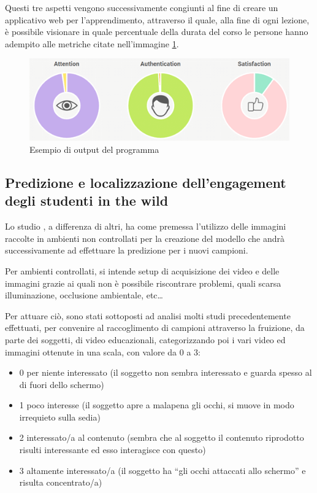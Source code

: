 Questi tre aspetti vengono successivamente congiunti al fine di creare un applicativo web per l’apprendimento, attraverso il quale, alla fine di ogni lezione, è possibile visionare in quale percentuale della durata del corso le persone hanno adempito alle metriche citate nell'immagine \ref{fig:image32}.

\begin{figure}
    \begin{center}    
        \includegraphics[width=1\linewidth]{images/3.png}
        \caption{Esempio di output del programma}
        \label{fig:image32}
    \end{center}
\end{figure}
 
\subsection{Predizione e localizzazione dell'engagement degli studenti in the wild}

Lo studio \cite{PredLocStudEngagInTheWild}, a differenza di altri, ha come premessa l’utilizzo delle immagini raccolte in ambienti non controllati per la creazione del modello che andrà successivamente ad effettuare la predizione per i nuovi campioni.

Per ambienti controllati, si intende setup di acquisizione dei video e delle immagini grazie ai quali non è possibile riscontrare problemi, quali scarsa illuminazione, occlusione ambientale, etc…

Per attuare ciò, sono stati sottoposti ad analisi molti studi precedentemente effettuati, per convenire al raccoglimento di campioni attraverso la fruizione, da parte dei soggetti, di video educazionali, categorizzando poi i vari video ed immagini ottenute in una scala, con valore da 0 a 3:
\begin{itemize}
    \item 0 \textrightarrow per niente interessato (il soggetto non sembra interessato e guarda spesso al di fuori dello schermo)
    \item 1 \textrightarrow poco interesse (il soggetto apre a malapena gli occhi, si muove in modo irrequieto sulla sedia)
    \item 2 \textrightarrow interessato/a al contenuto (sembra che al soggetto il contenuto riprodotto risulti interessante ed esso interagisce con questo)
    \item 3 \textrightarrow altamente interessato/a (il soggetto ha “gli occhi attaccati allo schermo” e risulta concentrato/a)
\end{itemize}


